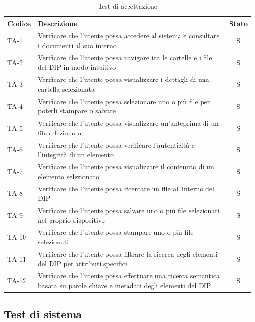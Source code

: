 \documentclass[a4paper,12pt]{article}
\begin{document}
\renewcommand{\arraystretch}{1.2}
\begin{table}[H]
\centering
\small
\begin{tabular}{|p{1.5cm}|p{8.5cm}|c|}
\hline
\rowcolor{zpusgreen!30}
\textbf{Codice} & \textbf{Descrizione} & \textbf{Stato} \\
\hline
TA-1 & Verificare che l'utente possa accedere al sistema e consultare i documenti al suo interno & S \\
\hline
TA-2 & Verificare che l'utente possa navigare tra le cartelle e i file del DIP in modo intuitivo & S \\
\hline
TA-3 & Verificare che l'utente possa visualizzare i dettagli di una cartella selezionata & S \\
\hline
TA-4 & Verificare che l'utente possa selezionare uno o più file per poterli stampare o salvare & S \\
\hline
TA-5 & Verificare che l'utente possa visualizzare un'anteprima di un file selezionato & S \\
\hline
TA-6 & Verificare che l'utente possa verificare l'autenticità e l'integrità di un elemento & S \\
\hline
TA-7 & Verificare che l'utente possa visualizzare il contenuto di un elemento selezionato & S \\
\hline
TA-8 & Verificare che l'utente possa ricercare un file all'interno del DIP & S \\
\hline
TA-9 & Verificare che l'utente possa salvare uno o più file selezionati nel proprio dispositivo & S \\
\hline
TA-10 & Verificare che l'utente possa stampare uno o più file selezionati & S \\
\hline
TA-11 & Verificare che l'utente possa filtrare la ricerca degli elementi del DIP per attributi specifici & S \\
\hline
TA-12 & Verificare che l'utente possa effettuare una ricerca semantica basata su parole chiave e metadati degli elementi del DIP & S \\
\hline
\end{tabular}
\caption{Test di accettazione}
\label{tab:test-accettazione}
\end{table}

\subsection{Test di sistema}
\end{document}
